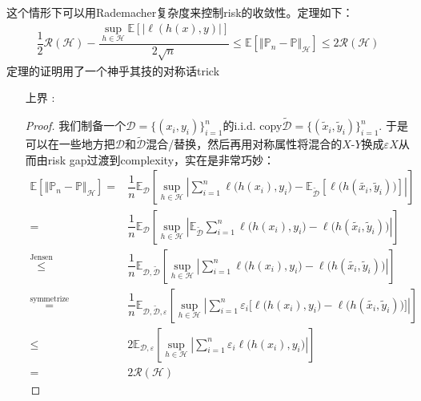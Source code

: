 \documentclass[11pt,a4paper]{ctexart}
\numberwithin{equation}{section}%
\begin{document}
这个情形下可以用Rademacher复杂度来控制risk的收敛性。定理如下：
    \begin{align*}
        \dfrac{ 1 }{ 2 } \mathcal{R}(\mathcal{H}) - \dfrac{ \mathop{ \sup  }\limits_{h\in\mathcal{H}}\mathbb{E}\left[ \left\vert\ell(h(x),y) \right\vert  \right] }{ 2\sqrt{n} }  \leq \mathbb{E}\left[ \left\Vert \mathbb{P}_n-\mathbb{P} \right\Vert_{\mathcal{H}}  \right]  \leq 2 \mathcal{R}(\mathcal{H})
    \end{align*}
    定理的证明用了一个神乎其技的对称话trick
\begin{itemize}[topsep=2pt,itemsep=0pt]
    \item[上界]: 
        


    \begin{proof}
        我们制备一个$ \mathcal{D}=\{(x_i,y_i)\}_{i=1}^n $的i.i.d. copy$ \tilde{\mathcal{D}}=\{(\tilde{x}_i,\tilde{y}_i)\}_{i=1}^n $. 于是可以在一些地方把$ \mathcal{D} $和$ \tilde{\mathcal{D}} $混合/替换，然后再用对称属性将混合的$ X $-$ Y $换成$ \varepsilon X $从而由risk gap过渡到complexity，实在是非常巧妙：
        \begin{align*}
            \mathbb{E}\left[ \left\Vert \mathbb{P}_n-\mathbb{P} \right\Vert _\mathcal{H} \right]= &\dfrac{ 1 }{ n }  \mathbb{E}_{\mathcal{D}}\left[ \mathop{ \sup  }\limits_{h\in\mathcal{H}}  \left\vert  \sum_{i=1}^n \ell\bigl(h(x_i), y_i\bigr) - \mathbb{E}_{\tilde{\mathcal{D}}}\left[ \ell\bigl(h(\tilde{x_i}, \tilde{y}_i)\bigr) \right]  \right\vert \right]   \\
            =& \dfrac{ 1 }{ n }  \mathbb{E}_{\mathcal{D}}\left[ \mathop{ \sup  }\limits_{h\in\mathcal{H}}  \left\vert \mathbb{E}_{\tilde{\mathcal{D}}} \sum_{i=1}^n \ell\bigl(h(x_i), y_i\bigr) - \ell\bigl(h(\tilde{x_i}, \tilde{y}_i)\bigr)  \right\vert \right] \\
            \mathop{ \leq  }\limits^{\text{Jensen}} & \dfrac{ 1 }{ n }  \mathbb{E}_{\mathcal{D},\tilde{\mathcal{D}}}\left[ \mathop{ \sup  }\limits_{h\in\mathcal{H}}  \left\vert  \sum_{i=1}^n \ell\bigl(h(x_i), y_i\bigr) - \ell\bigl(h(\tilde{x_i}, \tilde{y}_i)\bigr)  \right\vert \right]\\
            \mathop{ = }\limits^{\text{symmetrize}} & \dfrac{ 1 }{ n }  \mathbb{E}_{\mathcal{D},\tilde{\mathcal{D}}, \varepsilon }\left[ \mathop{ \sup  }\limits_{h\in\mathcal{H}}  \left\vert  \sum_{i=1}^n \varepsilon _i \big[ \ell\bigl(h(x_i), y_i\bigr) - \ell\bigl(h(\tilde{x_i}, \tilde{y}_i)\bigr) \big] \right\vert \right]\\
            \leq & 2 \mathbb{E}_{\mathcal{D},\varepsilon }\left[ \mathop{ \sup  }\limits_{h\in\mathcal{H}}  \left\vert  \sum_{i=1}^n \varepsilon _i \ell\bigl(h(x_i), y_i\bigr) \right\vert \right] \\
            =& 2 \mathcal{R}(\mathcal{H})
        \end{align*}
        

\end{proof}
\end{itemize}
\end{document}
